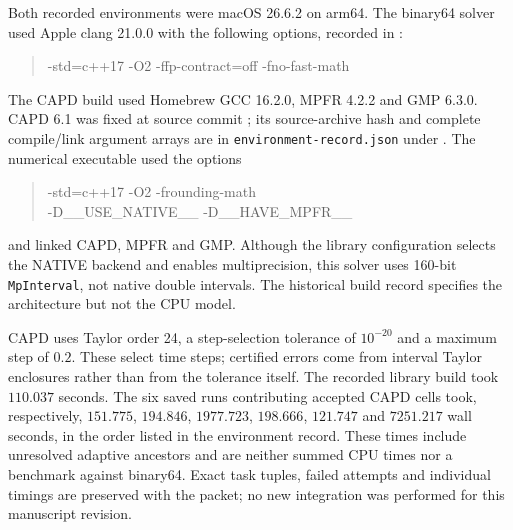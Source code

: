 Both recorded environments were macOS 26.6.2 on arm64. The binary64 solver
used Apple clang 21.0.0 with the following options, recorded in
:
\begin{quote}\small\ttfamily\raggedright
-std=c++17 -O2 -ffp-contract=off -fno-fast-math
\end{quote}
The CAPD build used Homebrew GCC 16.2.0, MPFR 4.2.2 and GMP 6.3.0.
CAPD 6.1 was fixed at source commit
; its source-archive hash and
complete compile/link argument arrays are in \texttt{environment-record.json}
under .
The numerical executable used the options
\begin{quote}\small\ttfamily\raggedright
-std=c++17 -O2 -frounding-math\\
-D\_\_USE\_NATIVE\_\_ -D\_\_HAVE\_MPFR\_\_
\end{quote}
and linked CAPD, MPFR and GMP. Although the library configuration selects
the NATIVE backend and enables multiprecision, this solver uses 160-bit
\texttt{MpInterval}, not native double intervals. The historical build
record specifies the architecture but not the CPU model.

CAPD uses Taylor order 24, a step-selection tolerance of $10^{-20}$ and a
maximum step of $0.2$. These select time steps; certified errors come from
interval Taylor enclosures rather than from the tolerance itself.
The recorded library build took $110.037$ seconds. The six saved runs
contributing accepted CAPD cells took, respectively,
$151.775$, $194.846$, $1977.723$, $198.666$, $121.747$ and $7251.217$
wall seconds, in the order listed in the environment record. These times
include unresolved adaptive ancestors and are neither summed CPU times nor
a benchmark against binary64. Exact task tuples, failed attempts and
individual timings are preserved with the packet; no new integration was
performed for this manuscript revision.

